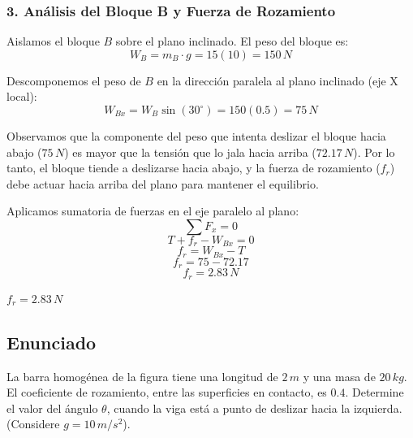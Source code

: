 \documentclass[12pt, a4paper]{article}
\begin{document}
\subsubsection*{3. Análisis del Bloque B y Fuerza de Rozamiento}
Aislamos el bloque $B$ sobre el plano inclinado. El peso del bloque es:
$$W_B = m_B \cdot g = 15(10) = 150 \, \si{N}$$

Descomponemos el peso de $B$ en la dirección paralela al plano inclinado (eje X local):
$$W_{Bx} = W_B \sin(30^\circ) = 150(0.5) = 75 \, \si{N}$$

Observamos que la componente del peso que intenta deslizar el bloque hacia abajo ($75 \, \si{N}$) es mayor que la tensión que lo jala hacia arriba ($72.17 \, \si{N}$). Por lo tanto, el bloque tiende a deslizarse hacia abajo, y la fuerza de rozamiento ($f_r$) debe actuar hacia arriba del plano para mantener el equilibrio.

Aplicamos sumatoria de fuerzas en el eje paralelo al plano:
$$\sum F_x = 0$$
$$T + f_r - W_{Bx} = 0$$
$$f_r = W_{Bx} - T$$
$$f_r = 75 - 72.17$$
$$f_r = 2.83 \, \si{N}$$

\begin{tcolorbox}[colback=green!5!white, colframe=green!50!black, title=Respuesta Final]
\centering \Large $f_r = 2.83 \, \si{N}$
\end{tcolorbox}

\newpage

\subsection*{Enunciado}
La barra homogénea de la figura tiene una longitud de $2 \, \si{m}$ y una masa de $20 \, \si{kg}$. El coeficiente de rozamiento, entre las superficies en contacto, es $0.4$. Determine el valor del ángulo $\theta$, cuando la viga está a punto de deslizar hacia la izquierda. (Considere $g=10\,\si{m/s^2}$).

\begin{center}
\end{center}
\end{document}
